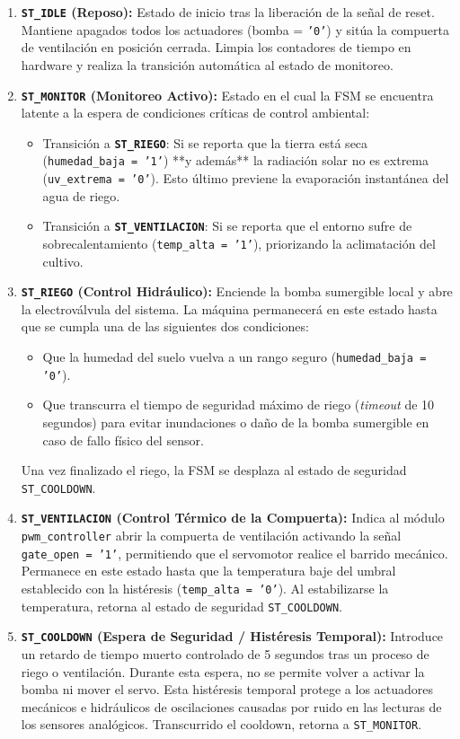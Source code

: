 \begin{enumerate}
	\item \textbf{\texttt{ST\_IDLE} (Reposo):}
	Estado de inicio tras la liberación de la señal de reset. Mantiene apagados todos los actuadores (bomba = \texttt{'0'}) y sitúa la compuerta de ventilación en posición cerrada. Limpia los contadores de tiempo en hardware y realiza la transición automática al estado de monitoreo.
	
	\item \textbf{\texttt{ST\_MONITOR} (Monitoreo Activo):}
	Estado en el cual la FSM se encuentra latente a la espera de condiciones críticas de control ambiental:
	\begin{itemize}
		\item Transición a \textbf{\texttt{ST\_RIEGO}}: Si se reporta que la tierra está seca (\texttt{humedad\_baja = '1'}) **y además** la radiación solar no es extrema (\texttt{uv\_extrema = '0'}). Esto último previene la evaporación instantánea del agua de riego.
		\item Transición a \textbf{\texttt{ST\_VENTILACION}}: Si se reporta que el entorno sufre de sobrecalentamiento (\texttt{temp\_alta = '1'}), priorizando la aclimatación del cultivo.
	\end{itemize}
	
	\item \textbf{\texttt{ST\_RIEGO} (Control Hidráulico):}
	Enciende la bomba sumergible local y abre la electroválvula del sistema. La máquina permanecerá en este estado hasta que se cumpla una de las siguientes dos condiciones:
	\begin{itemize}
		\item Que la humedad del suelo vuelva a un rango seguro (\texttt{humedad\_baja = '0'}).
		\item Que transcurra el tiempo de seguridad máximo de riego (\textit{timeout} de 10 segundos) para evitar inundaciones o daño de la bomba sumergible en caso de fallo físico del sensor.
	\end{itemize}
	Una vez finalizado el riego, la FSM se desplaza al estado de seguridad \texttt{ST\_COOLDOWN}.

	\item \textbf{\texttt{ST\_VENTILACION} (Control Térmico de la Compuerta):}
	Indica al módulo \texttt{pwm\_controller} abrir la compuerta de ventilación activando la señal \texttt{gate\_open = '1'}, permitiendo que el servomotor realice el barrido mecánico. Permanece en este estado hasta que la temperatura baje del umbral establecido con la histéresis (\texttt{temp\_alta = '0'}). Al estabilizarse la temperatura, retorna al estado de seguridad \texttt{ST\_COOLDOWN}.

	\item \textbf{\texttt{ST\_COOLDOWN} (Espera de Seguridad / Histéresis Temporal):}
	Introduce un retardo de tiempo muerto controlado de 5 segundos tras un proceso de riego o ventilación. Durante esta espera, no se permite volver a activar la bomba ni mover el servo. Esta histéresis temporal protege a los actuadores mecánicos e hidráulicos de oscilaciones causadas por ruido en las lecturas de los sensores analógicos. Transcurrido el cooldown, retorna a \texttt{ST\_MONITOR}.
\end{enumerate}
